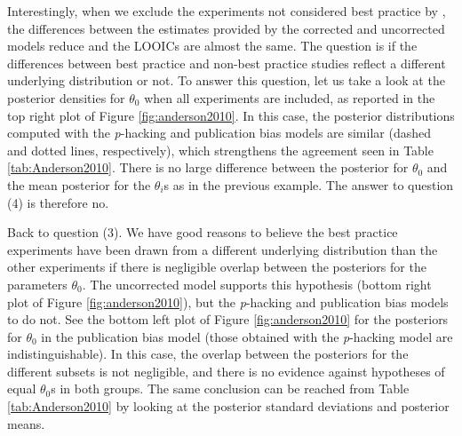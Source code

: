 \documentclass[useAMS,usenatbib,referee]{biom}
\begin{document}
Interestingly, when we exclude the experiments not considered best practice by \citet{anderson2010violent}, the differences between the estimates provided by the corrected and uncorrected models reduce and the LOOICs are almost the same. The question is if the differences between best practice and non-best practice studies reflect a different underlying distribution or not. To answer this question, let us take a look at the posterior densities for $\theta_{0}$ when all experiments are included, as reported in the top right plot of Figure \ref{fig:anderson2010}. In this case, the posterior distributions computed with the \textit{p}-hacking and publication bias models are similar (dashed and dotted lines, respectively), which strengthens the agreement seen in Table \ref{tab:Anderson2010}. There is no large difference between the posterior for $\theta_{0}$ and the mean posterior for the $\theta_{i}$s as in the previous example. The answer to question (4) is therefore no.

Back to question (3). We have good reasons to believe the best practice experiments have been drawn from a different underlying distribution than the other experiments if there is negligible overlap between the posteriors for the parameters $\theta_{0}$. The uncorrected model supports this hypothesis (bottom right plot of Figure \ref{fig:anderson2010}), but the \textit{p}-hacking and publication bias models to do not. See the bottom left plot of Figure \ref{fig:anderson2010} for the posteriors for $\theta_0$ in the publication bias model (those obtained with the \textit{p}-hacking model are indistinguishable). In this case, the overlap between the posteriors for the different subsets is not negligible, and there is no evidence against hypotheses of equal $\theta_0$s in both groups. The same conclusion can be reached from Table \ref{tab:Anderson2010} by looking at the posterior standard deviations and posterior means.
\end{document}
